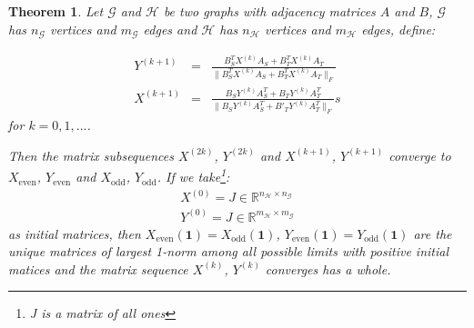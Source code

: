 \documentclass[a4paper,11pt]{report}
\newtheorem{theorem}{Theorem}[section]
\newcommand{\R}{{\mathbb R}}
\newcommand{\graf}{\mathscr{G}}
\newcommand{\grafeen}{\mathscr{H}}
\begin{document}
 \begin{theorem}\label{edgegrootbewijs}
   Let $\graf$ and $\grafeen$ be two graphs with adjacency matrices $A$ and $B$, $\graf$ has $n_\graf$ vertices and
   $m_\graf$ edges and $\grafeen$ has $n_\grafeen$ vertices and $m_\grafeen$ edges, define: 


   
 \begin{eqnarray}
  Y^{(k+1)} &=& \frac{B_S^TX^{(k)}A_S + B_T^TX^{(k)}A_T}{\|B_S^TX^{(k)}A_S + 
  B_T^TX^{(k)}A_T\|_F}\\
   X^{(k+1)} &=& \frac{B_SY^{(k)}A_S^T + B_TY^{(k)}A^T_T}{\|B_SY^{(k)}A_S^T + 
   B'_TY^{(k)}A^T_T\|_F}s
 \end{eqnarray}
  for  $k =  0,1,\ldots$.
  
  Then the matrix subsequences $X^{(2k)}$, $Y^{(2k)}$ and $X^{(k+1)}$, $Y^{(k+1)}$ 
  converge to $X_{\text{even}}$, $Y_{\text{even}}$ and $X_{\text{odd}}$, 
  $Y_{\text{odd}}$. If we take\footnote{J is a matrix of all ones}:
  \begin{eqnarray*}  X^{(0)} = J \in \R^{n_\grafeen \times n_\graf}\\
    Y^{(0)} = J \in \R^{m_\grafeen \times m_\graf}
  \end{eqnarray*}
 as initial matrices, then $X_{\text{even}}(\mathbf{1})=X_{\text{odd}}(\mathbf{1})$, $Y_{\text{even}}(\mathbf{1})= Y_{\text{odd}}(\mathbf{1})$ 
 are the unique matrices of largest 1-norm among all possible limits with positive 
 initial matices and the matrix sequence $X^{(k)}$, $Y^{(k)}$ converges has a 
 whole.
  \end{theorem}
\end{document}
